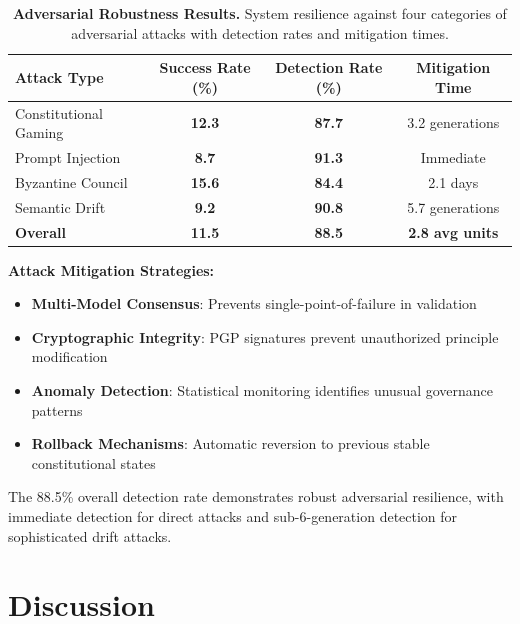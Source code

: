 \documentclass[sigconf,natbib]{acmart}
\newcommand{\tablesize}{\footnotesize} %
\newcommand{\tablenumfmt}[1]{\textbf{#1}} %
\begin{document}
\begin{table}[htbp]
  \centering
  \caption{\textbf{Adversarial Robustness Results.} System resilience against four categories of adversarial attacks with detection rates and mitigation times.}
  \label{tab:adversarial_results}
  \tablesize
  \begin{tabular}{@{}lccc@{}}
    \toprule
    \textbf{Attack Type} & \textbf{Success Rate (\%)} & \textbf{Detection Rate (\%)} & \textbf{Mitigation Time} \\
    \midrule
    Constitutional Gaming & \tablenumfmt{12.3} & \tablenumfmt{87.7} & 3.2 generations \\
    Prompt Injection & \tablenumfmt{8.7} & \tablenumfmt{91.3} & Immediate \\
    Byzantine Council & \tablenumfmt{15.6} & \tablenumfmt{84.4} & 2.1 days \\
    Semantic Drift & \tablenumfmt{9.2} & \tablenumfmt{90.8} & 5.7 generations \\
    \midrule
    \textbf{Overall} & \textbf{\tablenumfmt{11.5}} & \textbf{\tablenumfmt{88.5}} & \textbf{2.8 avg units} \\
    \bottomrule
  \end{tabular}
\end{table}

\textbf{Attack Mitigation Strategies:}
\begin{itemize}
    \item \textbf{Multi-Model Consensus}: Prevents single-point-of-failure in validation
    \item \textbf{Cryptographic Integrity}: PGP signatures prevent unauthorized principle modification
    \item \textbf{Anomaly Detection}: Statistical monitoring identifies unusual governance patterns
    \item \textbf{Rollback Mechanisms}: Automatic reversion to previous stable constitutional states
\end{itemize}

The 88.5\% overall detection rate demonstrates robust adversarial resilience, with immediate detection for direct attacks and sub-6-generation detection for sophisticated drift attacks.

\section{Discussion}
\label{sec:discussion}
\end{document}
